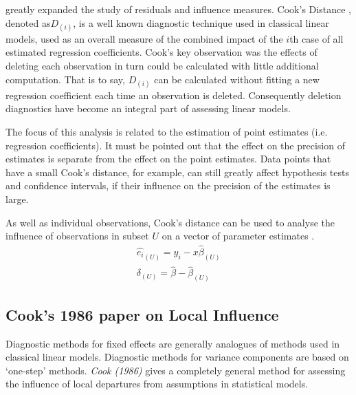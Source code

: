 \documentclass[12pt, a4paper]{report}
\theoremstyle{plain}
\theoremstyle{definition}
\theoremstyle{remark}
\begin{document}
		
		
		\citet{cook77} greatly expanded the study of residuals and influence measures. Cook's Distance , denoted as$D_{(i)}$, is a well known diagnostic technique used in classical linear models, used as an overall measure of the combined impact of the $i$th case of all estimated regression coefficients. Cook's key observation was the effects of deleting each observation in turn could be calculated with little additional computation. That is to say, $D_{(i)}$ can be calculated without fitting a new regression coefficient each time an observation is deleted.  Consequently deletion diagnostics have become an integral part of assessing linear models. 
		
		
		The focus of this analysis is related to the estimation of point estimates (i.e. regression coefficients). It must be pointed out that the effect on the precision of estimates is separate from the effect on the point estimates. Data points that
		have a small Cook's distance, for example, can still greatly affect hypothesis tests and confidence intervals, if their  influence on the precision of the estimates is large.
		
		As well as individual observations, Cook's distance can be used to analyse the influence of observations in subset $U$ on a vector of parameter estimates \citep{cook77}.
		\begin{eqnarray}
		\hat{e_{i}}_{(U)} = y_{i} - x\hat{\beta}_{(U)}\\
		\delta_{(U)} = \hat{\beta} - \hat{\beta}_{(U)}
		\end{eqnarray}
		
		
		\subsection{Cook's 1986 paper on Local Influence}%
		
				Diagnostic methods for fixed effects are generally analogues of methods used in classical linear models.
				Diagnostic methods for variance components are based on `one-step' methods.
				\textit{Cook (1986)} gives a completely general method for assessing the influence of local departures from assumptions in statistical models.
				
\end{document}
